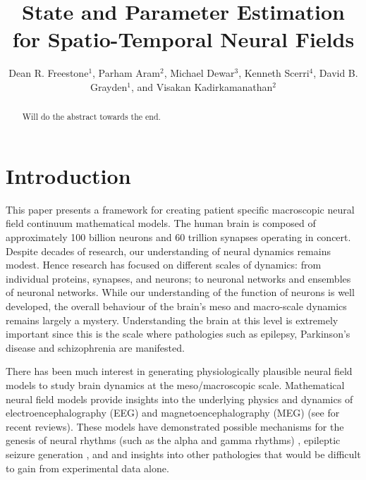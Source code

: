 \documentclass[12pt]{iopart}		%
\begin{document}
\title[State and Parameter Estimation for Spatio-Temporal Neural Fields]{State and Parameter Estimation for Spatio-Temporal Neural Fields}

\author{Dean R. Freestone$^1$, Parham Aram$^2$, Michael Dewar$^3$, Kenneth Scerri$^4$, David B. Grayden$^1$, and Visakan Kadirkamanathan$^2$}

\address{$^1$ Department
of Electrical and Electronic Engineering, University of Melbourne, Melbourne,
Vic, 3010 Australia}
\address{$^2$ Department
of Automatic Control and Systems Engineering, University of Sheffield, Mappin Street, Sheffield,
S1 3JD, UK}
\address{$^3$ Department of Applied Physics and Applied Mathematics, Columbia University, US}
\address{$^4$ Ken's}
\begin{abstract}
Will do the abstract towards the end.
\end{abstract}

\maketitle

\section{Introduction}
This paper presents a framework for creating patient specific macroscopic neural field continuum mathematical models. The human brain is composed of approximately 100 billion neurons and 60 trillion synapses operating in concert. Despite decades of research, our understanding of neural dynamics remains modest. Hence research has focused on different scales of dynamics: from individual proteins, synapses, and neurons; to neuronal networks and ensembles of neuronal networks. While our understanding of the function of neurons is well developed, the overall behaviour of the brain's meso and macro-scale dynamics remains largely a mystery.  Understanding the brain at this level is extremely important since this is the scale where pathologies such as epilepsy, Parkinson's disease and schizophrenia are manifested.

There has been much interest in generating physiologically plausible neural field models to study brain dynamics at the meso/macroscopic scale. Mathematical neural field  models provide insights into the underlying physics and dynamics of electroencephalography (EEG) and magnetoencephalography (MEG) (see \cite{Deco2008} \cite{David2003} for recent reviews). These models have demonstrated possible mechanisms for the genesis of neural rhythms (such as the alpha and gamma rhythms) \cite{Liley1999} \cite{RENNIE2000}, epileptic seizure generation \cite{DaSilva2003}, \cite{Suffczynski2004} and \cite{Wendling2005} and insights into other pathologies \cite{Moran2008} \cite{Schiff2009} that would be difficult to gain from experimental data alone. 
\end{document}
